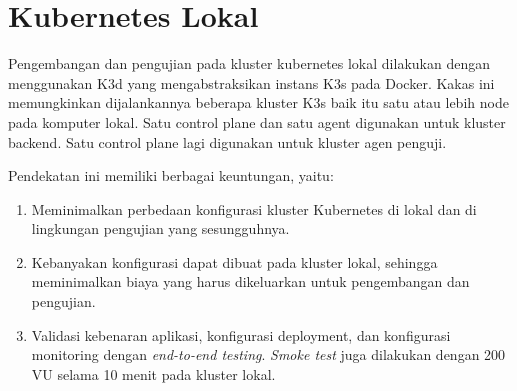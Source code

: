 \pagebreak

\section{Kubernetes Lokal}

Pengembangan dan pengujian pada kluster kubernetes lokal dilakukan dengan menggunakan K3d yang mengabstraksikan instans K3s pada Docker. Kakas ini memungkinkan dijalankannya beberapa kluster K3s baik itu satu atau lebih node pada komputer lokal. Satu control plane dan satu agent digunakan untuk kluster backend. Satu control plane lagi digunakan untuk kluster agen penguji.

Pendekatan ini memiliki berbagai keuntungan, yaitu:

\begin{enumerate}
    \item Meminimalkan perbedaan konfigurasi kluster Kubernetes di lokal dan di lingkungan pengujian yang sesungguhnya.
    \item Kebanyakan konfigurasi dapat dibuat pada kluster lokal, sehingga meminimalkan biaya yang harus dikeluarkan untuk pengembangan dan pengujian.
    \item Validasi kebenaran aplikasi, konfigurasi deployment, dan konfigurasi monitoring dengan \textit{end-to-end testing}. \textit{Smoke test} juga dilakukan dengan 200 VU selama 10 menit pada kluster lokal.
\end{enumerate}
